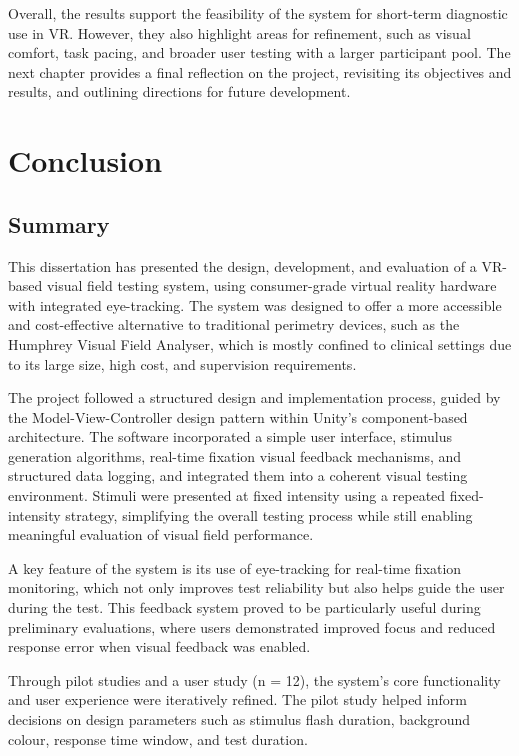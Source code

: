 \documentclass{l4proj}
\begin{document}
Overall, the results support the feasibility of the system for short-term diagnostic use in VR. However, they also highlight areas for refinement, such as visual comfort, task pacing, and broader user testing with a larger participant pool. The next chapter provides a final reflection on the project, revisiting its objectives and results, and outlining directions for future development.



\chapter{Conclusion}    


\section{Summary}

This dissertation has presented the design, development, and evaluation of a VR-based visual field testing system, using consumer-grade virtual reality hardware with integrated eye-tracking. The system was designed to offer a more accessible and cost-effective alternative to traditional perimetry devices, such as the Humphrey Visual Field Analyser, which is mostly confined to clinical settings due to its large size, high cost, and supervision requirements. 

The project followed a structured design and implementation process, guided by the Model-View-Controller design pattern within Unity’s component-based architecture. The software incorporated a simple user interface, stimulus generation algorithms, real-time fixation visual feedback mechanisms, and structured data logging, and integrated them into a coherent visual testing environment. Stimuli were presented at fixed intensity using a repeated fixed-intensity strategy, simplifying the overall testing process while still enabling meaningful evaluation of visual field performance. 

A key feature of the system is its use of eye-tracking for real-time fixation monitoring, which not only improves test reliability but also helps guide the user during the test. This feedback system proved to be particularly useful during preliminary evaluations, where users demonstrated improved focus and reduced response error when visual feedback was enabled. 

Through pilot studies and a user study (n = 12), the system’s core functionality and user experience were iteratively refined. The pilot study helped inform decisions on design parameters such as stimulus flash duration, background colour, response time window, and test duration. 
\end{document}
